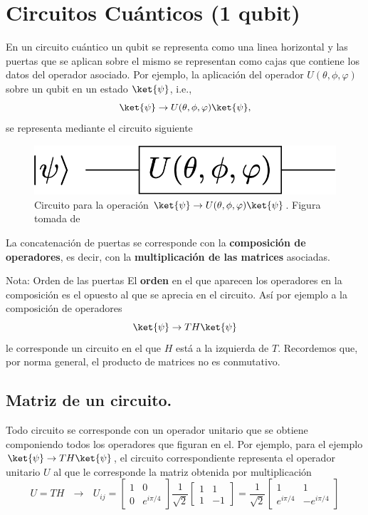 \documentclass[a4paper,11pt]{book} %
\numberwithin{equation}{chapter}
\begin{document}
  
    \section{Circuitos Cuánticos (1 qubit)}
    
En un circuito cuántico un qubit se representa como una linea horizontal y las puertas que se aplican sobre 
el mismo se representan como cajas que contiene los datos del operador asociado. Por ejemplo, la aplicación del operador $U(\theta,\phi,\varphi)$ sobre un qubit en un estado $\ket{\psi}$, i.e.,
	\begin{equation*}
	\ket{\psi} \to  U(\theta,\phi,\varphi)\ket{\psi},
	\end{equation*}
se representa mediante el circuito siguiente
	\begin{figure}[H]
	\centering 
	\includegraphics[width=0.3\linewidth]{Figuras/Fig_puertas_simples}
	\caption{Circuito para la operación $\ket{\psi} \to  U(\theta,\phi,\varphi)\ket{\psi}$. Figura tomada de \cite{Curso-JMas}}
	\label{Fig_puertas_simples}
	\end{figure}
	
 La concatenación de puertas se corresponde con la \textbf{composición de operadores}, es decir, con la \textbf{multiplicación de las matrices} asociadas. 

	\begin{mybox_blue}{Nota: Orden de las puertas}
	El \textbf{orden} en el que aparecen los operadores en la composición es el opuesto al que se 
	aprecia en el circuito. Así por ejemplo a la composición de operadores 
	$$
	\ket{\psi} \to  TH \ket{\psi} 
	$$
	le corresponde un circuito en el que  $H$ está a la izquierda de $T$. Recordemos que, por norma general,
	el producto de matrices no es conmutativo.
	\end{mybox_blue} 
 
 


		\subsection{Matriz de un circuito.}
		
Todo circuito se corresponde con un operador unitario que se obtiene componiendo todos los operadores que figuran en el. Por ejemplo, para el ejemplo $	\ket{\psi} \to  TH \ket{\psi}$, el circuito correspondiente representa el operador unitario $U$ al que le corresponde la matriz obtenida por multiplicación
	$$
	U = T H ~~~\to ~~~ U_{ij} = 
	\begin{bmatrix}1&0\\0&e^{i\pi/4}\end{bmatrix} \frac{1}{\sqrt{2}} 
	\begin{bmatrix} 1& 1 \\ 1 & -1 \end{bmatrix}  = 
	\frac{1}{\sqrt{2}} \begin{bmatrix} 1& 1 \\ e^{i\pi/4} & -e^{i\pi/4} \end{bmatrix} 
	$$
\end{document}
